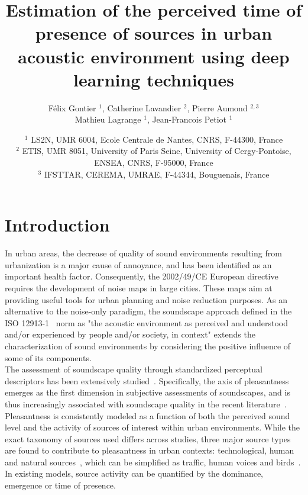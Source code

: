 \documentclass[11pt,a4paper]{article}
\begin{document}
\author{F\'elix Gontier $^1$, Catherine Lavandier $^2$, Pierre Aumond $^{2, 3}$\\Mathieu Lagrange $^1$, Jean-Francois Petiot $^1$}
\date{
$^1$ LS2N, UMR 6004, Ecole Centrale de Nantes, CNRS, F-44300, France\\
$^2$ ETIS, UMR 8051, University of Paris Seine, University of Cergy-Pontoise, ENSEA, CNRS, F-95000, France\\
$^3$ IFSTTAR, CEREMA, UMRAE, F-44344, Bouguenais, France
}
\title{Estimation of the perceived time of presence of sources in urban acoustic environment using deep learning techniques}
\maketitle


\begin{abstract}

\end{abstract}


\section{Introduction}
\label{sec:intro}

In urban areas, the decrease of quality of sound environments resulting from urbanization is a major cause of annoyance, and has been identified as an important health factor. Consequently, the 2002/49/CE European directive~\cite{ec2002} requires the development of noise maps in large cities. These maps aim at providing useful tools for urban planning and noise reduction purposes. As an alternative to the noise-only paradigm, the soundscape approach defined in the ISO 12913-1~\cite{iso2014} norm as "the acoustic environment as perceived and understood and/or experienced by people and/or society, in context" extends the characterization of sound environments by considering the positive influence of some of its components.\\

The assessment of soundscape quality through standardized perceptual descriptors has been extensively studied~\cite{viollon2000, axelsson2010, cain2013, jeon2018, aletta2016}. Specifically, the axis of pleasantness emerges as the first dimension in subjective assessments of soundscapes, and is thus increasingly associated with soundscape quality in the recent literature~\cite{axelsson2010, aumond2017, delaitre2014}. Pleasantness is consistently modeled as a function of both the perceived sound level and the activity of sources of interest within urban environments. While the exact taxonomy of sources used differs across studies, three major source types are found to contribute to pleasantness in urban contexts: technological, human and natural sources~\cite{nilsson2007, axelsson2010}, which can be simplified as traffic, human voices and birds~\cite{lavandier2006, ricciardi2014, aumond2017}. In existing models, source activity can be quantified by the dominance, emergence or time of presence.\\
\end{document}
